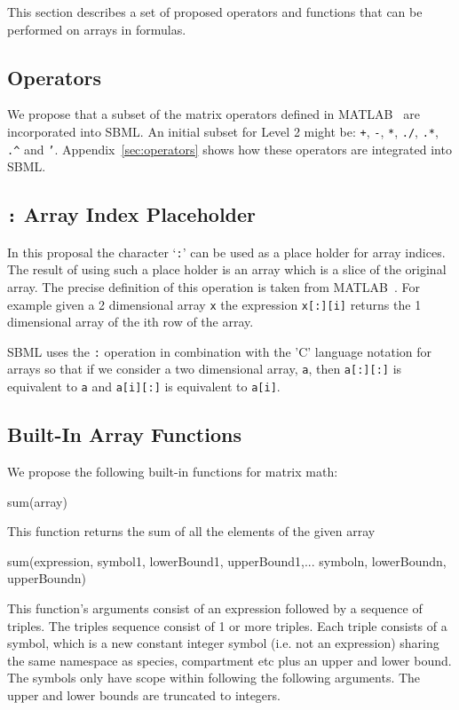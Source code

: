 \documentclass{cekarticle}
\begin{document}
This section describes a set of proposed operators and functions
that can be performed on arrays in formulas.

\subsection{Operators}

We propose that a subset of the matrix operators defined in
MATLAB~\citep{matlab:1998} are incorporated into SBML. An initial
subset for Level 2 might be: \texttt{+}, \texttt{-}, \texttt{*},
\texttt{./}, \texttt{.*}, \verb+.^+ and \texttt{'}.
Appendix~\ref{sec:operators} shows how these operators are
integrated into SBML.

\subsection{\texttt{:} Array Index Placeholder}
\label{sec:placeholder}

In this proposal the character `\texttt{:}' can be used as a
place holder for array indices.  The result of using such a place
holder is an array which is a slice of the original array. The
precise definition of this operation is taken from
MATLAB~\citep{matlab:1998}.  For example given a 2 dimensional
array \texttt{x} the expression \texttt{x[:][i]} returns the 1
dimensional array of the ith row of the array.

SBML uses the \texttt{:} operation in combination with the 'C'
language notation for arrays so that if we consider a two
dimensional array, \texttt{a}, then \texttt{a[:][:]} is
equivalent to \texttt{a} and \texttt{a[i][:]} is equivalent to
\texttt{a[i]}.

\subsection{Built-In Array Functions}

We propose the following built-in functions for matrix math:

\begin{example}
sum(array)
\end{example}

This function returns the sum of all the elements of the given array

\begin{example}
sum(expression, symbol1, lowerBound1, upperBound1,...
    symboln, lowerBoundn, upperBoundn)
\end{example}
This function's arguments consist of an expression followed by a
sequence of triples.  The triples sequence consist of 1 or more
triples. Each triple consists of a symbol, which is a new
constant integer symbol (i.e. not an expression) sharing the same
namespace as species, compartment etc plus an upper and lower
bound.  The symbols only have scope within following the following
arguments.  The upper and lower bounds are truncated to integers.
\end{document}
